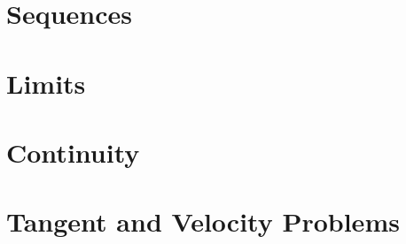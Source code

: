 \section{Sequences}

  
\section{Limits} 


\section{Continuity}


\section{Tangent and Velocity Problems}
